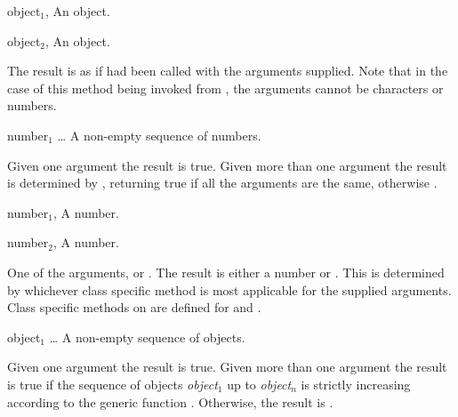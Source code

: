\begin{optDefinition}
%
\begin{specargs}
    \item[object$_1$, \classref{object}] An object.
    \item[object$_2$, \classref{object}] An object.
\end{specargs}
%
\result%
The result is as if  had been called with the arguments
supplied.
%
\remarks%
Note that in the case of this method being invoked from , the
arguments cannot be characters or numbers.

\function{=}
%
\begin{arguments}
    \item[{number$_1$ \ldots}] A non-empty sequence of numbers.
\end{arguments}
%
\result%
Given one argument the result is true.  Given more than one argument the result
is determined by , returning true if all the arguments are
the same, otherwise \nil.

%
\begin{genericargs}
    \item[number$_1$, \classref{number}] A number.
    \item[number$_2$, \classref{number}] A number.
\end{genericargs}
%
\result%
One of the arguments, or \nil.
%
\remarks%
The result is either a number or \nil.  This is determined by whichever
class specific method is most applicable for the supplied arguments.
%
\seealso%
Class specific methods on  are defined for
 and .

%
%

\function{<}
%
\begin{arguments}
    \item[object$_1$ \ldots] A non-empty sequence of objects.
\end{arguments}
%
\result%
Given one argument the result is true.  Given more than one argument the result
is true if the sequence of objects {\em object$_1$} up to {\em object$_n$} is
strictly increasing according to the generic function .
Otherwise, the result is \nil.


\end{optDefinition}
